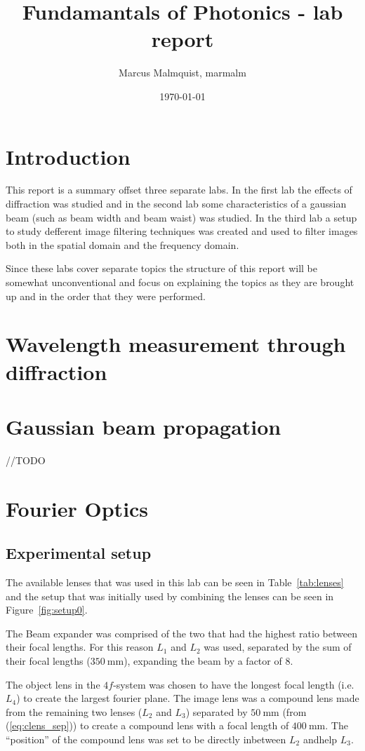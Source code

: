\documentclass[12pt,a4paper]{article}
\title{Fundamantals of Photonics - lab report}
\author{Marcus Malmquist, marmalm}
\date{\today}
\begin{document}
\maketitle

\section{Introduction}
This report is a summary offset three separate labs. In the first lab the effects of diffraction was studied and in the second lab some characteristics of a gaussian beam (such as beam width and beam waist) was studied. In the third lab a setup to study defferent image filtering techniques was created and used to filter images both in the spatial domain and the frequency domain.

Since these labs cover separate topics the structure of this report will be somewhat unconventional and focus on explaining the topics as they are brought up and in the order that they were performed.
\section{Wavelength measurement
  through diffraction}

\section{Gaussian beam propagation}
//TODO
\section{Fourier Optics}
\subsection{Experimental setup}\label{sec:setup}
The available lenses that was used in this lab can be seen in Table~\ref{tab:lenses} and the setup that was initially used by combining the lenses can be seen in Figure~\ref{fig:setup0}.

The Beam expander was comprised of the two that had the highest ratio between their focal lengths. For this reason $L_1$ and $L_2$ was used, separated by the sum of their focal lengths ($\SI{350}{\milli\metre}$), expanding the beam by a factor of 8.

The object lens in the $4f$-system was chosen to have the longest focal length (i.e. $L_4$) to create the largest fourier plane. The image lens was a compound lens made from the remaining two lenses ($L_2$ and $L_3$) separated by $\SI{50}{\milli\metre}$ (from (\ref{eq:clens_sep})) to create a compound lens with a focal length of $\SI{400}{\milli\metre}$. The ``position'' of the compound lens was set to be directly inbetween $L_2$ andhelp $L_3$.
\end{document}

